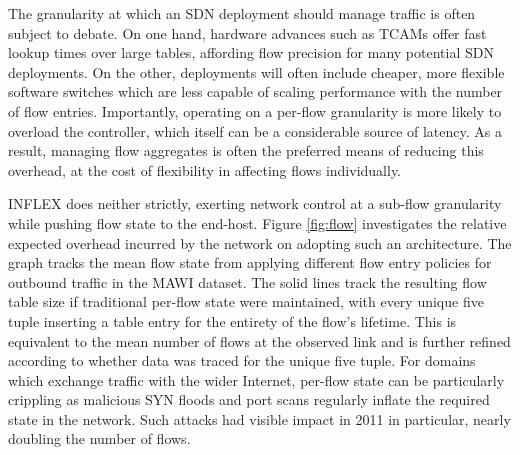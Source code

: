 The granularity at which an \ac{SDN} deployment should manage traffic is often subject to debate.
On one hand, hardware advances such as \acp{TCAM} offer fast lookup times over large tables, affording flow precision for many potential \ac{SDN} deployments.
On the other, deployments will often include cheaper, more flexible software switches which are less capable of scaling performance with the number of flow entries.
Importantly, operating on a per-flow granularity is more likely to overload the controller, which itself can be a considerable source of latency.
As a result, managing flow aggregates is often the preferred means of reducing this overhead, at the cost of flexibility in affecting flows individually.

INFLEX does neither strictly, exerting network control at a sub-flow granularity while pushing flow state to the end-host.
Figure \ref{fig:flow} investigates the relative expected overhead incurred by the network on adopting such an architecture.
The graph tracks the mean flow state from applying different flow entry policies for outbound traffic in the MAWI dataset.
The solid lines track the resulting flow table size if traditional per-flow state were maintained, with every unique five tuple inserting a table entry for the entirety of the flow's lifetime.
This is equivalent to the mean number of flows at the observed link and is further refined according to whether data was traced for the unique five tuple.
For domains which exchange traffic with the wider Internet, per-flow state can be particularly crippling as malicious SYN floods and port scans regularly inflate the required state in the network.
Such attacks had visible impact in 2011 in particular, nearly doubling the number of flows.

